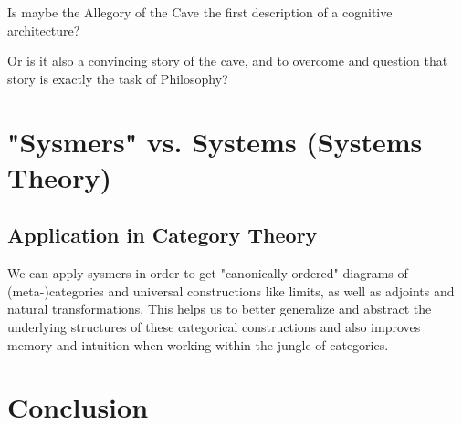 \documentclass[12pt,a4paper]{article}
\begin{document}
Is maybe the Allegory of the Cave the first description of a cognitive architecture?

Or is it also a convincing story of the cave, and to overcome and question that story is exactly the task of Philosophy? 
\section{"Sysmers" vs. Systems (Systems Theory)}

\subsection{Application in Category Theory}
We can apply sysmers in order to get "canonically ordered" diagrams of (meta-)categories and universal constructions like limits, as well as adjoints and natural transformations. This helps us to better generalize and abstract the underlying structures of these categorical constructions and also improves memory and intuition when working within the jungle of categories.


\section*{Conclusion}


\printbibliography
\end{document}
